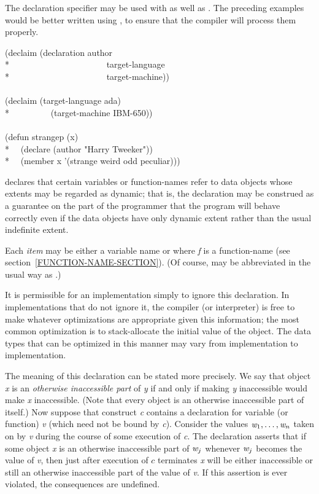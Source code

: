 \begin{flushdesc}
The  declaration specifier may be used with 
as well as .  The preceding examples would be better written
using , to ensure that the compiler will process them properly.

\begin{lisp}
(declaim (declaration author \\*
~~~~~~~~~~~~~~~~~~~~~~target-language \\*
~~~~~~~~~~~~~~~~~~~~~~target-machine)) \\
 \\
(declaim (target-language ada) \\*
~~~~~~~~~(target-machine IBM-650)) \\
 \\
(defun strangep (x) \\*
~~(declare (author "Harry Tweeker")) \\*
~~(member x '(strange weird odd peculiar)))
\end{lisp}

\item[\cdf{dynamic-extent}]

 declares that
certain variables or function-names refer to data objects whose extents may be
regarded as dynamic; that is, the declaration may be construed as a guarantee on
the part of the programmer that the program will behave correctly even if the
data objects have only dynamic extent rather than the usual indefinite extent.

Each \emph{item} may be either a variable name or 
where \emph{f} is a function-name (see section~\ref{FUNCTION-NAME-SECTION}).
(Of course,  may be abbreviated in the usual way as
.)

  It is permissible for an implementation simply to ignore this declaration.  In
implementations that do not ignore it, the compiler (or interpreter) is free to
make whatever optimizations are appropriate given this information; the most
common optimization is to stack-allocate the initial value of the object. The
data types that can be optimized in this manner may vary from implementation to
implementation.

The meaning of this declaration can be stated more precisely.  We say that
object \emph{x} is an \emph{otherwise inaccessible part} of \emph{y} if and only
if making \emph{y} inaccessible would make \emph{x} inaccessible.  (Note that
every object is an otherwise inaccessible part of itself.)  Now suppose that
construct \emph{c} contains a  declaration for variable (or
function) \emph{v} (which need not be bound by \emph{c}).  Consider the values
$\emph{w}_1, \ldots, \emph{w}_{n}$ taken on by \emph{v}
during the course of some execution of \emph{c}.  The declaration asserts that
if some object \emph{x} is an otherwise inaccessible part of
$\emph{w}_{j}$ whenever $\emph{w}_{j}$ becomes the value of \emph{v}, then just
after execution of $c$ terminates \emph{x} will be either inaccessible or still
an otherwise inaccessible part of the value of \emph{v}.  If this assertion is
ever violated, the consequences are undefined.


\end{flushdesc}
